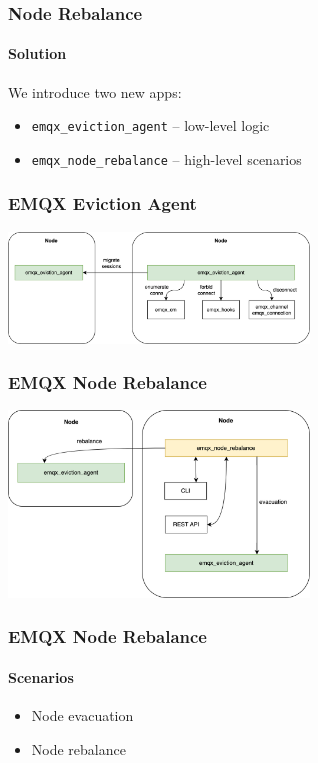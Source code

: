 \documentclass{beamer}
\begin{document}
\begin{frame}
    \frametitle{Node Rebalance}
    \framesubtitle{Solution}

    We introduce two new apps:
    \begin{itemize}
        \item \lstinline{emqx_eviction_agent} -- low-level logic
        \item \lstinline{emqx_node_rebalance} -- high-level scenarios
    \end{itemize}
\end{frame}

\begin{frame}
    \frametitle{EMQX Eviction Agent}
    \begin{center}
        \includegraphics[width=8cm, keepaspectratio]{images/eviction-agent.png}
    \end{center}
\end{frame}

\begin{frame}
    \frametitle{EMQX Node Rebalance}
    \begin{center}
        \includegraphics[width=8cm, keepaspectratio]{images/node-rebalance.png}
    \end{center}
\end{frame}

\begin{frame}
    \frametitle{EMQX Node Rebalance}
    \framesubtitle{Scenarios}
    \begin{itemize}
        \item Node evacuation
        \item Node rebalance
    \end{itemize}
\end{frame}
\end{document}
